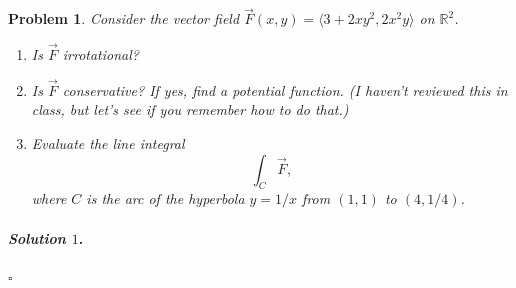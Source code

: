 \documentclass[reqno]{amsart}
\theoremstyle{plain}
\newtheorem{problem}{Problem}
\theoremstyle{definition}
\newenvironment{solution1}{\paragraph{\emph{Solution $1$}.}}{\hfill$\square$}
\begin{document}
\begin{problem}
Consider the vector field $\vec{F}(x,y) = \langle 3+2xy^{2},2x^{2}y \rangle$ on $\mathbb{R}^{2}$.
\begin{enumerate}
\item Is $\vec{F}$ irrotational?
\item Is $\vec{F}$ conservative?  If yes, find a potential function.  (I haven't reviewed this in class, but let's see if you remember how to do that.)
\item Evaluate the line integral 
$$\int_{C}\vec{F}, $$
where $C$ is the arc of the hyperbola $y = 1/x$ from $(1,1)$ to $(4,1/4)$.
\end{enumerate}
\end{problem}
\begin{solution1}

\end{solution1}
\end{document}
